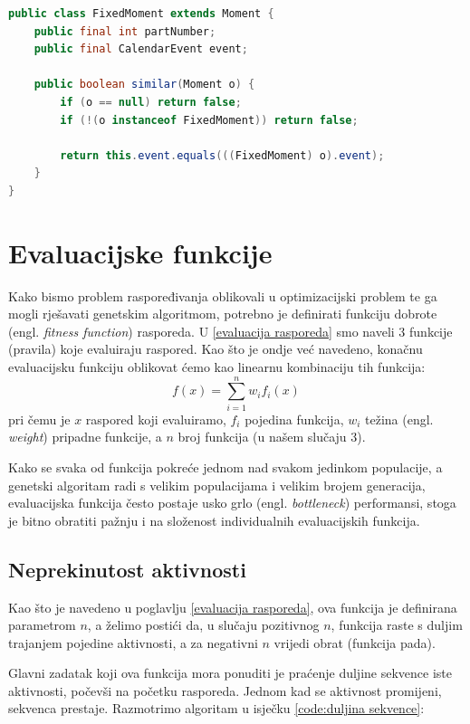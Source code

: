 \documentclass[times, utf8, zavrsni]{fer}
\begin{document}
\begin{lstlisting}[language=java, caption=Razred FixedMoment, label={code:fixedMoment}]
public class FixedMoment extends Moment {
	public final int partNumber;
    public final CalendarEvent event;
	
	public boolean similar(Moment o) {
        if (o == null) return false;
        if (!(o instanceof FixedMoment)) return false;

        return this.event.equals(((FixedMoment) o).event);
    }
}
\end{lstlisting}

\section{Evaluacijske funkcije}\label{evaluacijske funkcije}
Kako bismo problem raspoređivanja oblikovali u optimizacijski problem te ga mogli rješavati genetskim algoritmom, potrebno je definirati funkciju dobrote (engl. \textit{fitness function}) rasporeda. U \ref{evaluacija rasporeda} smo naveli 3 funkcije (pravila) koje evaluiraju raspored. Kao što je ondje već navedeno, konačnu evaluacijsku funkciju oblikovat ćemo kao linearnu kombinaciju tih funkcija:
\begin{equation}
f(x) = \sum_{i=1}^{n} w_i f_i(x)
\end{equation}
pri čemu je $x$ raspored koji evaluiramo, $f_i$ pojedina funkcija, $w_i$ težina (engl. \textit{weight}) pripadne funkcije, a $n$ broj funkcija (u našem slučaju 3).

Kako se svaka od funkcija pokreće jednom nad svakom jedinkom populacije, a genetski algoritam radi s velikim populacijama i velikim brojem generacija, evaluacijska funkcija često postaje usko grlo (engl. \textit{bottleneck}) performansi, stoga je bitno obratiti pažnju i na složenost individualnih evaluacijskih funkcija.

\subsection{Neprekinutost aktivnosti}\label{fja:neprekinutost aktivnosti}
Kao što je navedeno u poglavlju \ref{evaluacija rasporeda}, ova funkcija je definirana parametrom $n$, a želimo postići da, u slučaju pozitivnog $n$, funkcija raste s duljim trajanjem pojedine aktivnosti, a za negativni $n$ vrijedi obrat (funkcija pada).

Glavni zadatak koji ova funkcija mora ponuditi je praćenje duljine sekvence iste aktivnosti, počevši na početku rasporeda. Jednom kad se aktivnost promijeni, sekvenca prestaje.
Razmotrimo algoritam u isječku \ref{code:duljina sekvence}:
\end{document}
